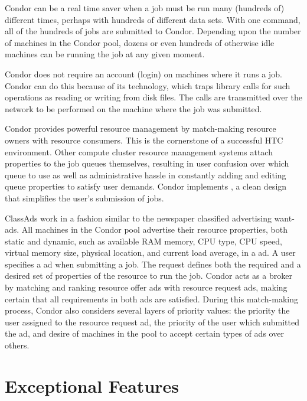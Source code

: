 Condor can be a real time saver when a job
must be run many (hundreds of) different times,
perhaps with hundreds of different data sets.
With one command, all of the hundreds of jobs are submitted to Condor.
Depending upon the number of machines in the Condor pool,
dozens or even hundreds of otherwise idle machines
can be running the job at any given moment.

Condor does not require an account (login) on machines where it runs a job.
Condor can do this because of its 
technology,
which traps
library calls for such operations as reading or writing from disk
files.
The calls are transmitted over the network to be performed on the machine
where the job was submitted.

Condor provides powerful resource management by
match-making resource
owners with resource consumers.
This is the cornerstone of a successful HTC environment.
Other compute cluster resource management
systems attach properties to the job queues themselves,
resulting in user confusion over which queue to use as well as administrative
hassle in constantly adding and editing queue properties to satisfy user
demands.
Condor implements 
,
a clean design that simplifies the user's submission of jobs.

ClassAds work in a fashion similar to the newspaper classified
advertising want-ads. All machines in the Condor pool advertise their
resource properties, both static and dynamic,
such as available RAM memory, CPU type, CPU speed,
virtual memory size, physical location, and current load average,
in a  ad.
A user specifies a  ad
when submitting a job.
The request defines both the required and a desired set of properties
of the resource to run the job.
Condor acts as a broker by matching and ranking resource
offer ads with resource request ads, making certain that all
requirements in both ads are satisfied.
During this match-making process,
Condor also considers several layers of priority values:
the priority the user assigned to the resource request ad,
the priority of the user which submitted the ad,
and desire of
machines in the pool to accept certain types of ads over others. 

\section{Exceptional Features}

